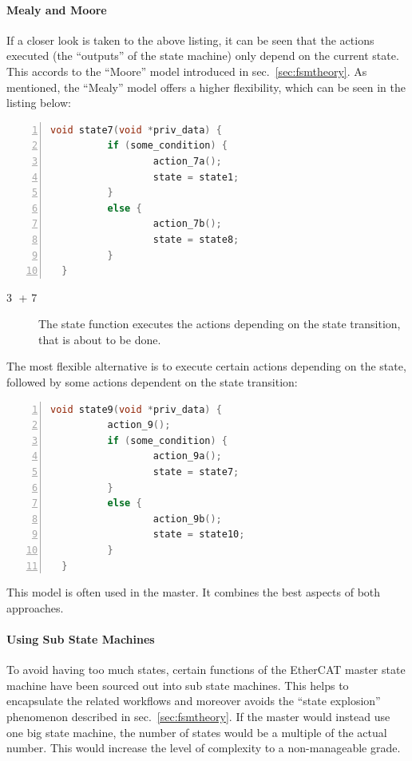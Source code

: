 \documentclass[a4paper,12pt,BCOR6mm,bibtotoc,idxtotoc]{scrbook}
\newcommand{\linenum}[1]{\normalfont\textcircled{\tiny #1}}
\begin{document}
\paragraph{Mealy and Moore}

If a closer look is taken to the above listing, it can be seen that the
actions executed (the ``outputs'' of the state machine) only depend on the
current state. This accords to the ``Moore'' model introduced in
sec.~\ref{sec:fsmtheory}. As mentioned, the ``Mealy'' model offers a higher
flexibility, which can be seen in the listing below:

\begin{lstlisting}[gobble=2,language=C,numbers=left]
  void state7(void *priv_data) {
          if (some_condition) {
                  action_7a();
                  state = state1;
          }
          else {
                  action_7b();
                  state = state8;
          }
  }
\end{lstlisting}

\begin{description}

\item[\linenum{3} + \linenum{7}] The state function executes the actions
depending on the state transition, that is about to be done.

\end{description}

The most flexible alternative is to execute certain actions depending
on the state, followed by some actions dependent on the state
transition:

\begin{lstlisting}[gobble=2,language=C,numbers=left]
  void state9(void *priv_data) {
          action_9();
          if (some_condition) {
                  action_9a();
                  state = state7;
          }
          else {
                  action_9b();
                  state = state10;
          }
  }
\end{lstlisting}

This model is often used in the master. It combines the best aspects of both
approaches.

\paragraph{Using Sub State Machines}

To avoid having too much states, certain functions of the EtherCAT master
state machine have been sourced out into sub state machines.  This helps to
encapsulate the related workflows and moreover avoids the ``state explosion''
phenomenon described in sec.~\ref{sec:fsmtheory}. If the master would instead
use one big state machine, the number of states would be a multiple of the
actual number. This would increase the level of complexity to a non-manageable
grade.
\end{document}
